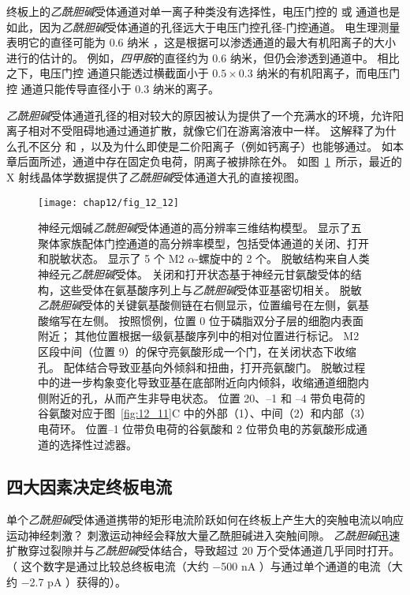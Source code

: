 终板上的\textit{乙酰胆碱}受体通道对单一离子种类没有选择性，电压门控的  或  通道也是如此，因为\textit{乙酰胆碱}受体通道的孔径远大于电压门控孔径-门控通道。
电生理测量表明它的直径可能为 0.6 纳米 ，这是根据可以渗透通道的最大有机阳离子的大小进行的估计的。
例如，\textit{四甲胺}的直径约为 0.6 纳米，但仍会渗透到通道中。
相比之下，电压门控  通道只能透过横截面小于 $ 0.5 \times 0.3 $ 纳米的有机阳离子，而电压门控  通道只能传导直径小于 0.3 纳米的离子。


\textit{乙酰胆碱}受体通道孔径的相对较大的原因被认为提供了一个充满水的环境，允许阳离子相对不受阻碍地通过通道扩散，就像它们在游离溶液中一样。
这解释了为什么孔不区分  和 ，以及为什么即使是二价阳离子（例如钙离子）也能够通过。
如本章后面所述，通道中存在固定负电荷，阴离子被排除在外。
如图~\ref{fig:12_12}~所示，最近的 X 射线晶体学数据提供了\textit{乙酰胆碱}受体通道大孔的直接视图。


\begin{figure}[htbp]
	\centering
	\texttt{[image: chap12/fig\_12\_12]}
	\caption{神经元烟碱\textit{乙酰胆碱}受体通道的高分辨率三维结构模型。
		显示了五聚体家族配体门控通道的高分辨率模型，包括受体通道的关闭、打开和脱敏状态。
		显示了 5 个 M2 $\alpha$-螺旋中的 2 个。
		脱敏结构来自人类神经元\textit{乙酰胆碱}受体。
		关闭和打开状态基于神经元甘氨酸受体的结构，这些受体在氨基酸序列上与\textit{乙酰胆碱}受体亚基密切相关。
		脱敏\textit{乙酰胆碱}受体的关键氨基酸侧链在右侧显示，位置编号在左侧，氨基酸缩写在左侧。
		按照惯例，位置 0 位于磷脂双分子层的细胞内表面附近；
		其他位置根据一级氨基酸序列中的相对位置进行标记。
		M2 区段中间（位置 9）的保守亮氨酸形成一个门，在关闭状态下收缩孔。
		配体结合导致亚基向外倾斜和扭曲，打开亮氨酸门。
		脱敏过程中的进一步构象变化导致亚基在底部附近向内倾斜，收缩通道细胞内侧附近的孔，从而产生非导电状态。
		位置 20、–1 和 –4 带负电荷的谷氨酸对应于图~\ref{fig:12_11}C 中的外部（1）、中间（2）和内部（3） 电荷环。
		位置–1 位带负电荷的谷氨酸和 2 位带负电的苏氨酸形成通道的选择性过滤器\cite{morales2016x}。}
	\label{fig:12_12}
\end{figure}



\subsection{四大因素决定终板电流}

单个\textit{乙酰胆碱}受体通道携带的矩形电流阶跃如何在终板上产生大的突触电流以响应运动神经刺激？
刺激运动神经会释放大量乙酰胆碱进入突触间隙。
\textit{乙酰胆碱}迅速扩散穿过裂隙并与\textit{乙酰胆碱}受体结合，导致超过 20 万个受体通道几乎同时打开。
（ 这个数字是通过比较总终板电流（大约 −500 nA ）与通过单个通道的电流（大约 −2.7 pA ）获得的）。


